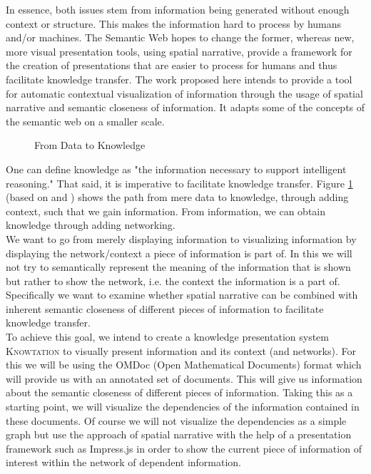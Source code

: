 \documentclass[twoside, 12pt]{article}
\newcommand{\sys}{\textsc{Knowtation}\xspace}
\begin{document}
In essence, both issues stem from information being generated without enough context or structure. This makes the information hard to process by humans and/or machines. The Semantic Web hopes to change the former, whereas new, more visual presentation tools, using spatial narrative, provide a framework for the creation of presentations that are easier to process for humans and thus facilitate knowledge transfer. The work proposed here intends to provide a tool for automatic contextual visualization of information through the usage of spatial narrative and semantic closeness of information. It adapts some of the concepts of the semantic web on a smaller scale.\\

\begin{figure}[H]
        \centering
                \caption{From Data to Knowledge}
                \label{fig:dataknow}
\end{figure}

One can define knowledge as "the information necessary to support intelligent reasoning." \cite{Kohlhase:Complog:base} That said, it is imperative to facilitate knowledge transfer. Figure \ref{fig:dataknow} (based on \cite{ProbstRaubRomhardt} and \cite{Kohlhase:Complog:base}) shows the path from mere data to knowledge, through adding context, such that we gain information. From information, we can obtain knowledge through adding networking.\\

We want to go from merely displaying information to visualizing information by displaying the network/context a piece of information is part of. In this we will not try to semantically represent the meaning of the information that is shown but rather to show the network, i.e. the context the information is a part of. Specifically we want to examine whether spatial narrative can be combined with inherent semantic closeness of different pieces of information to facilitate knowledge transfer.\\

To achieve this goal, we intend to create a knowledge presentation system \sys to visually present information and its context (and networks). For this we will be using the OMDoc (Open Mathematical Documents) format which will provide us with an annotated set of documents. This will give us information about the semantic closeness of different pieces of information. Taking this as a starting point, we will visualize the dependencies of the information contained in these documents. Of course we will not visualize the dependencies as a simple graph but use the approach of spatial narrative with the help of a presentation framework such as Impress.js in order to show the current piece of information of interest within the network of dependent information.\\
\end{document}
